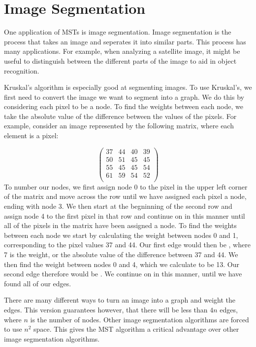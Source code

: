
\section*{Image Segmentation}


One application of MSTs is image segmentation. Image segmentation is the process that takes an image and seperates it into similar parts. This process has many applications. For example, when analyzing a satellite image, it might be useful to distinguish between the different parts of the image to aid in object recognition.

Kruskal's algorithm is especially good at segmenting images. To use Kruskal's, we first need to convert the image we want to segment into a graph. We do this by considering each pixel to be a node. To find the weights between each node, we take the absolute value of the difference between the values of the pixels. For example, consider an image represented by the following matrix, where each element is a pixel:

\[
\begin{pmatrix}
37 & 44 & 40 & 39 \\
50 & 51 & 45 & 45 \\
55 & 45 & 45 & 54 \\
61 & 59 & 54 & 52 \\
\end{pmatrix}
\]
To number our nodes, we first assign node 0 to the pixel in the upper left corner of the matrix and move across the row until we have assigned each pixel a node, ending with node 3. We then start at the begninning of the second row and assign node 4 to the first pixel in that row and continue on in this manner until all of the pixels in the matrix have been assigned a node. To find the weights between each node we start by calculating the weight between nodes 0 and 1, corresponding to the pixel values 37 and 44. Our first edge would then be , where 7 is the weight, or the absolute value of the difference between 37 and 44. We then find the weight between nodes 0 and 4, which we calculate to be 13. Our second edge therefore would be . We continue on in this manner, until we have found all of our edges. 
	
There are many different ways to turn an image into a graph and weight the edges. This version guarantees however, that there will be less than $4n$ edges, where $n$ is the number of nodes. Other image segmentation algorithms are forced to use $n^2$ space.
This gives the MST algorithm a critical advantage over other image segmentation algorithms.

